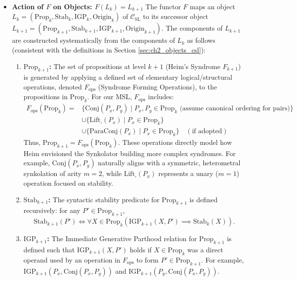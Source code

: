 \documentclass[
    12pt,              %
    a4paper,           %
    headings=normal,   %
    twoside=true,      %
    BCOR=8mm,          %
]{scrbook}
\newcommand{\synkolationsstufe}{m}
\newcommand{\syndrom}{F}
\newcommand{\BoxSyn}{\square}
\newcommand{\Propk}[1]{\text{Prop}_{#1}}
\newcommand{\IGPk}[1]{\text{IGP}_{#1}}
\newcommand{\fops}{F_{\text{ops}}}
\begin{document}
\begin{itemize}
    \item   \textbf{Action of \(F\) on Objects: \(F(L_k) = L_{k+1}\)}
        The functor \(F\) maps an object \(L_k = (\text{Prop}_k, \text{Stab}_k, \text{IGP}_k, \text{Origin}_k)\) of \(\mathcal{C}_{\text{SL}}\) to its successor object \(L_{k+1} = (\text{Prop}_{k+1}, \text{Stab}_{k+1}, \text{IGP}_{k+1}, \text{Origin}_{k+1})\). The components of \(L_{k+1}\) are constructed systematically from the components of \(L_k\) as follows (consistent with the definitions in Section \ref{sec:ch2_objects_csl}):

        \begin{enumerate}[label=(\roman*)]
            \item  \textbf{\(\text{Prop}_{k+1}\):} The set of propositions at level \(k+1\) (Heim's Syndrome \(\syndrom_{k+1}\)) is generated by applying a defined set of elementary logical/structural operations, denoted \textbf{\(\fops\)} (Syndrome Forming Operations), to the propositions in \(\text{Prop}_k\). For our MSL, \(\fops\) includes:
                \begin{align*}
                    \fops(\text{Prop}_k) = &\{ \text{Conj}(P_x, P_y) \mid P_x, P_y \in \text{Prop}_k \text{ (assume canonical ordering for pairs)} \} \\
                                       &\cup \{ \text{Lift}_\BoxSyn(P_x) \mid P_x \in \text{Prop}_k \} \\
                                       &\cup \{ \text{ParaConj}(P_x) \mid P_x \in \text{Prop}_k \} \quad (\text{if adopted})
                \end{align*}
                Thus, \(\text{Prop}_{k+1} = \fops(\text{Prop}_k)\). These operations directly model how Heim envisioned the Synkolator building more complex syndromes. For example, \(\text{Conj}(P_x, P_y)\) naturally aligns with a symmetric, heterometral synkolation of arity \(\synkolationsstufe=2\), while \(\text{Lift}_\BoxSyn(P_x)\) represents a unary (\(\synkolationsstufe=1\)) operation focused on stability.

            \item  \textbf{\(\text{Stab}_{k+1}\):} The syntactic stability predicate for \(\text{Prop}_{k+1}\) is defined recursively: for any \(P' \in \text{Prop}_{k+1}\),
                \[ \text{Stab}_{k+1}(P') \iff \forall X \in \Propk{k} \left( \IGPk{k+1}(X, P') \implies \text{Stab}_k(X) \right). \]

            \item  \textbf{\(\text{IGP}_{k+1}\):} The Immediate Generative Parthood relation for \(\text{Prop}_{k+1}\) is defined such that \(\text{IGP}_{k+1}(X, P')\) holds if \(X \in \text{Prop}_k\) was a direct operand used by an operation in \(\fops\) to form \(P' \in \text{Prop}_{k+1}\). For example, \(\text{IGP}_{k+1}(P_x, \text{Conj}(P_x,P_y))\) and \(\text{IGP}_{k+1}(P_y, \text{Conj}(P_x,P_y))\).


\end{enumerate}
\end{itemize}
\end{document}
